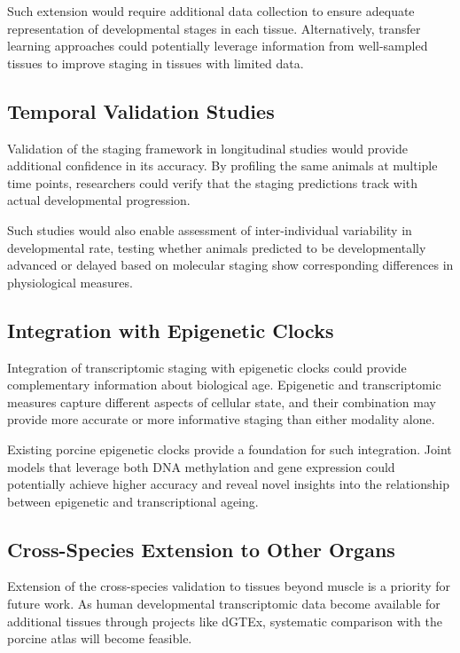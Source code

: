 Such extension would require additional data collection to ensure adequate representation of developmental stages in each tissue. Alternatively, transfer learning approaches could potentially leverage information from well-sampled tissues to improve staging in tissues with limited data.

\subsection{Temporal Validation Studies}

Validation of the staging framework in longitudinal studies would provide additional confidence in its accuracy. By profiling the same animals at multiple time points, researchers could verify that the staging predictions track with actual developmental progression.

Such studies would also enable assessment of inter-individual variability in developmental rate, testing whether animals predicted to be developmentally advanced or delayed based on molecular staging show corresponding differences in physiological measures.

\subsection{Integration with Epigenetic Clocks}

Integration of transcriptomic staging with epigenetic clocks could provide complementary information about biological age. Epigenetic and transcriptomic measures capture different aspects of cellular state, and their combination may provide more accurate or more informative staging than either modality alone.

Existing porcine epigenetic clocks \parencite{schachtschneider_epigenetic_2021} provide a foundation for such integration. Joint models that leverage both DNA methylation and gene expression could potentially achieve higher accuracy and reveal novel insights into the relationship between epigenetic and transcriptional ageing.

\subsection{Cross-Species Extension to Other Organs}

Extension of the cross-species validation to tissues beyond muscle is a priority for future work. As human developmental transcriptomic data become available for additional tissues through projects like dGTEx, systematic comparison with the porcine atlas will become feasible.

